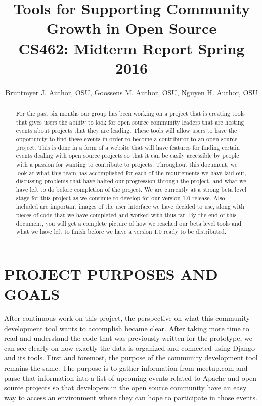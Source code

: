 \documentclass[draftclsnofoot,10pt,onecolumn]{IEEEtran} %
\begin{document}

\title{Tools for Supporting Community Growth in Open Source \\ {\large CS462: Midterm Report Spring 2016}}

\author{Bruntmyer J. Author, OSU, Goossens M. Author, OSU, Nguyen H. Author, OSU}



\maketitle
\begin{abstract}
For the past six months our group has been working on a project that is creating tools that
gives users the ability to look for open source community leaders that are
hosting events about projects that they are leading. These tools will allow
users to have the opportunity to find these events in order to become a
contributor to an open source project. This is done in a form of a website that
will have features for finding certain events dealing with open source projects
so that it can be easily accessible by people with a passion for wanting to
contribute to projects. Throughout this document, we look at what this team has
accomplished for each of the requirements we have laid out, discussing problems
that have halted our progression through the project, and what we have left to
do before completion of the project. We are currently at a strong beta level
stage for this project as we continue to develop for our version 1.0
release. Also included are important images of the user interface we have decided
to use, along with pieces of code that we have completed and worked with thus
far. By the end of this document, you will get a complete picture of how we
reached our beta level tools and what we have left to finish before we have
a version 1.0 ready to be distributed.
\end{abstract}

\newpage


\section{PROJECT PURPOSES AND GOALS}
After continuous work on this project, the perspective on what
this community development tool wants to accomplish became clear. After taking
more time to read and understand the code that was previously written for the
prototype, we can see clearly on how exactly the data is organized and connected
using Django and its tools. First and foremost, the purpose of the community
development tool remains the same. The purpose is to gather information from
meetup.com and parse that information into a list of upcoming events related to
Apache and open source projects so that developers in the open source community
have an easy way to access an environment where they can hope to participate in those
events.
\end{document}
